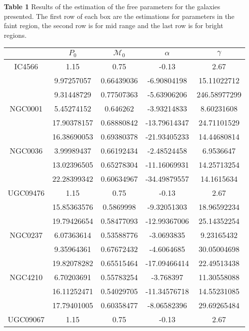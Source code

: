 \begin{table}
  \label{tb1}
  \begin{centering}
  \scriptsize\textbf{Table 1}  Results of the estimation of the free parameters for the galaxies presented. The first row of each box are the estimations for parameters in the faint region, the second row is for mid range and the last row is for bright regions. \\
  \end{centering}
  \centering
  \begin{tabular}{ c c c c c }
     & $P_0$ & $\mathcal{M}_0$ & $\alpha$ & $\gamma$ \\ \hline \hline
    IC4566   & 1.15 & 0.75 & -0.13 & 2.67 \\
     & 9.97257057  & 0.66439036 & -6.90804198  & 15.11022712  \\
     & 9.31448729  & 0.77507363 & -5.63906206  & 246.58977299 \\ \hline
    NGC0001  & 5.45274152  & 0.646262   & -3.93214833  & 8.60231608   \\
     & 17.90378157 & 0.68880842 & -13.79614347 & 24.71101529 \\
     & 16.38690053 & 0.69380378 & -21.93405233 & 14.44680814 \\ \hline
    NGC0036  & 3.99989437 & 0.66192434 & -2.48524458 & 6.9536647 \\
     & 13.02396505 & 0.65278304 & -11.16069931 & 14.25713254 \\
     & 22.28399342 & 0.60634967 & -34.49879557 & 14.1615634 \\ \hline
    UGC09476 & 1.15 & 0.75 & -0.13 & 2.67 \\
     & 15.85363576 & 0.5869998  & -9.32051303  & 18.96592234 \\
     & 19.79426654 & 0.58477093 & -12.99367006 & 25.14352254 \\ \hline
    NGC0237  & 6.07363614 & 0.53588776 & -3.0693835 & 9.23165432 \\
     & 9.35964361 & 0.67672432 & -4.6064685 & 30.05004698 \\
     & 19.82078282 & 0.65515464 & -17.09466414 & 22.49513438 \\ \hline
    NGC4210  & 6.70203691 & 0.55783254 & -3.768397 & 11.30558088 \\
     & 16.11252471 & 0.54029705 & -11.34576718 & 14.55231085 \\
     & 17.79401005 & 0.60358477 & -8.06582396 & 29.69265484 \\ \hline
    UGC09067 & 1.15 & 0.75 & -0.13 & 2.67 \\

\end{tabular}
\end{table}

